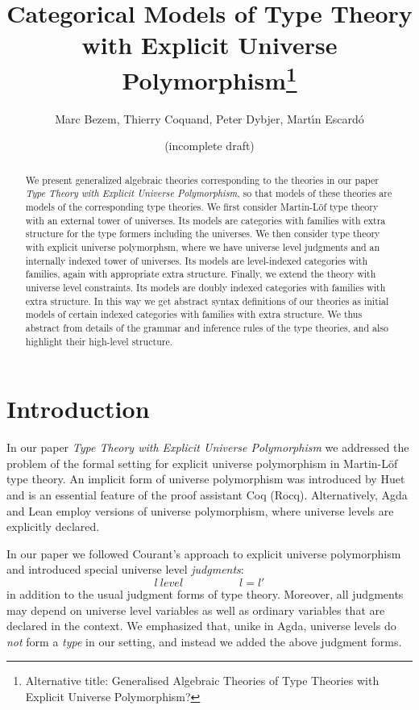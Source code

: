 \documentclass[11pt,a4paper]{article}
\theoremstyle{definition}
\begin{document}
\title{Categorical Models of Type Theory\\
with Explicit Universe Polymorphism\footnote{Alternative title: Generalised Algebraic Theories of Type Theories with Explicit Universe Polymorphism?}}

\author{Marc Bezem, Thierry Coquand, Peter Dybjer, Mart\'{\i}n Escard\'o}

\date{(incomplete draft)}
\maketitle

\begin{abstract}
We present generalized algebraic theories corresponding to the theories in our paper 
{\em Type Theory with Explicit Universe Polymorphism}, so that models of these theories are models of the corresponding type theories. We first consider Martin-Löf type theory with an external tower of universes. Its models are categories with families with extra structure for the type formers including the universes. We then consider type theory with explicit universe polymorphsm, where we have universe level judgments and an internally indexed tower of universes. Its models are level-indexed categories with families, again with appropriate extra structure. Finally, we extend the theory with universe level constraints. Its models are doubly indexed categories with families with extra structure. In this way we get abstract syntax definitions of our theories as initial models of certain indexed categories with families with extra structure. We thus abstract from details of the grammar and inference rules of the type theories, and also highlight their high-level structure.
\end{abstract}

\section{Introduction}

In our paper {\em Type Theory with Explicit Universe Polymorphism} \cite{BezemCDE22} we addressed the problem of the formal setting for explicit universe polymorphism in Martin-Löf type theory. An implicit form of universe polymorphism was introduced by Huet \cite{Huet87} and is an essential feature of the proof assistant Coq (Rocq). Alternatively, Agda and Lean employ versions of universe polymorphism, where universe levels are explicitly declared. 

In our paper we followed Courant's approach to explicit universe polymorphism  \cite{Courant02} and introduced special universe level {\em judgments}:
$$
l\ level
\hspace{5em}
l = l'
$$
in addition to the usual judgment forms of type theory. Moreover, all judgments may depend on universe level variables as well as ordinary variables that are declared in the context. We emphasized that, unike in Agda, universe levels do {\em not} form a {\em type} in our setting, and instead we added the above judgment forms. 
\end{document}
